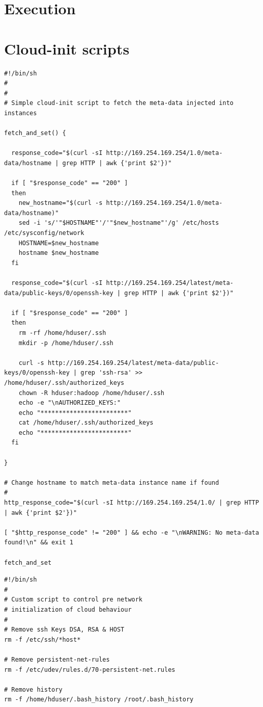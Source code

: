 \documentclass{sig-alternate}
\begin{document}
\section{Execution}




\appendix

\section{Cloud-init scripts}\label{sec:apx}
\lstset{
  captionpos=b,
  frame=none,
  language=bash,
  numbers=none,
  showspaces=false,
  showstringspaces=false
}
\begin{lstlisting}[caption=cloud-init, label=src:init]
#!/bin/sh
#
#
# Simple cloud-init script to fetch the meta-data injected into instances

fetch_and_set() {

  response_code="$(curl -sI http://169.254.169.254/1.0/meta-data/hostname | grep HTTP | awk {'print $2'})"
  
  if [ "$response_code" == "200" ]
  then
    new_hostname="$(curl -s http://169.254.169.254/1.0/meta-data/hostname)"
    sed -i 's/'"$HOSTNAME"'/'"$new_hostname"'/g' /etc/hosts /etc/sysconfig/network
    HOSTNAME=$new_hostname
    hostname $new_hostname
  fi
  
  response_code="$(curl -sI http://169.254.169.254/latest/meta-data/public-keys/0/openssh-key | grep HTTP | awk {'print $2'})"

  if [ "$response_code" == "200" ]
  then
    rm -rf /home/hduser/.ssh
    mkdir -p /home/hduser/.ssh

    curl -s http://169.254.169.254/latest/meta-data/public-keys/0/openssh-key | grep 'ssh-rsa' >> /home/hduser/.ssh/authorized_keys
    chown -R hduser:hadoop /home/hduser/.ssh
    echo -e "\nAUTHORIZED_KEYS:"
    echo "************************"
    cat /home/hduser/.ssh/authorized_keys
    echo "************************"
  fi

}

# Change hostname to match meta-data instance name if found
#
http_response_code="$(curl -sI http://169.254.169.254/1.0/ | grep HTTP | awk {'print $2'})"

[ "$http_response_code" != "200" ] && echo -e "\nWARNING: No meta-data found!\n" && exit 1

fetch_and_set
\end{lstlisting}

\begin{lstlisting}[caption=cloud-prenet, label=src:pre]
#!/bin/sh
#
# Custom script to control pre network
# initialization of cloud behaviour
#
# Remove ssh Keys DSA, RSA & HOST
rm -f /etc/ssh/*host*

# Remove persistent-net-rules
rm -f /etc/udev/rules.d/70-persistent-net.rules

# Remove history
rm -f /home/hduser/.bash_history /root/.bash_history
\end{lstlisting}
\end{document}
